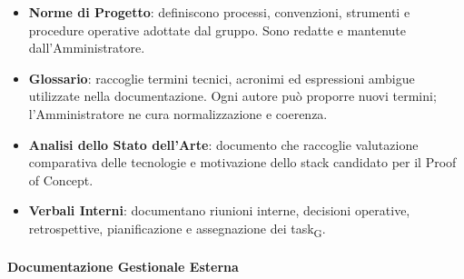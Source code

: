 \begin{itemize}
    \item \textbf{Norme di Progetto}: definiscono processi, convenzioni, strumenti
    e procedure operative adottate dal gruppo. Sono redatte e mantenute
    dall'Amministratore.

    \item \textbf{Glossario}: raccoglie termini tecnici, acronimi ed espressioni
    ambigue utilizzate nella documentazione. Ogni autore può proporre nuovi
    termini; l'Amministratore ne cura normalizzazione e coerenza.

    \item \textbf{Analisi dello Stato dell'Arte}: documento che raccoglie valutazione comparativa 
    delle tecnologie e motivazione dello stack candidato per il Proof of Concept.

    \item \textbf{Verbali Interni}: documentano riunioni interne, decisioni operative,
    retrospettive, pianificazione e assegnazione dei task\textsubscript{G}.
\end{itemize}

\paragraph{Documentazione Gestionale Esterna}

